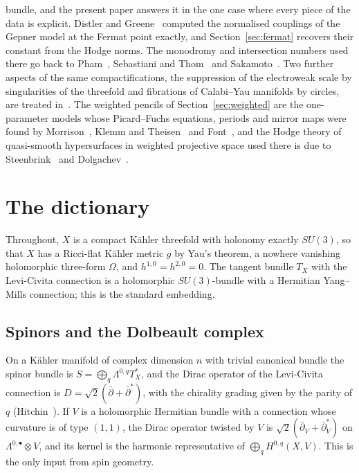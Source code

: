 \documentclass[11pt]{amsart}
\theoremstyle{definition}
\theoremstyle{remark}
\begin{document}
bundle, and the present paper answers it in the one case where every piece
of the data is explicit. Distler and Greene~\cite{DG88} computed the
normalised couplings of the Gepner model at the Fermat point exactly, and
Section~\ref{sec:fermat} recovers their constant from the Hodge norms. The
monodromy and intersection numbers used there go back to
Pham~\cite{Pha65}, Sebastiani and Thom~\cite{ST71} and
Sakamoto~\cite{Sak74}. Two further aspects of the same compactifications,
the suppression of the electroweak scale by singularities of the threefold
and fibrations of Calabi--Yau manifolds by circles, are treated
in~\cite{Bha26b,Bha25}. The weighted pencils of Section~\ref{sec:weighted}
are the one-parameter models whose Picard--Fuchs equations, periods and
mirror maps were found by Morrison~\cite{Mor92}, Klemm and
Theisen~\cite{KT93} and Font~\cite{Fon93}, and the Hodge theory of
quasi-smooth hypersurfaces in weighted projective space used there is due
to Steenbrink~\cite{Ste77} and Dolgachev~\cite{Dol82}.

\section{The dictionary}\label{sec:dictionary}

Throughout, $X$ is a compact K\"ahler threefold with holonomy exactly
$SU(3)$, so that $X$ has a Ricci-flat K\"ahler metric $g$ by Yau's
theorem, a nowhere vanishing holomorphic three-form $\Omega$, and
$h^{1,0}=h^{2,0}=0$. The tangent bundle $T_X$ with the Levi-Civita
connection is a holomorphic $SU(3)$-bundle with a Hermitian Yang--Mills
connection; this is the standard embedding.

\subsection{Spinors and the Dolbeault complex}

On a K\"ahler manifold of complex dimension $n$ with trivial canonical
bundle the spinor bundle is $S=\bigoplus_{q}\Lambda^{0,q}T^*_X$, and the
Dirac operator of the Levi-Civita connection is $D=\sqrt2(\bar\partial+
\bar\partial^*)$, with the chirality grading given by the parity of $q$
(Hitchin~\cite{Hit74}). If $V$ is a holomorphic Hermitian bundle with a
connection whose curvature is of type $(1,1)$, the Dirac operator twisted by
$V$ is $\sqrt2(\bar\partial_V+\bar\partial_V^*)$ on $\Lambda^{0,\bullet}
\otimes V$, and its kernel is the harmonic representative of
$\bigoplus_q H^{0,q}(X,V)$. This is the only input from spin geometry.
\end{document}
